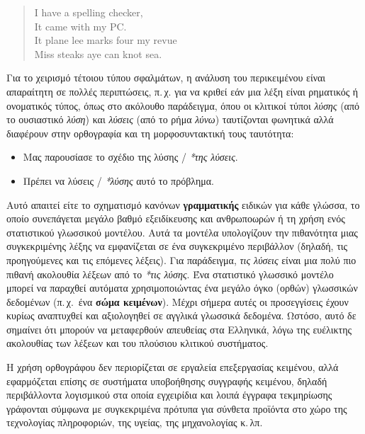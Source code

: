 \documentclass[]{../../metanetpaper}
\begin{document}
\begin{multicols}{2}
\begin{quote}
  I have a spelling checker,\\
  It came with my PC.\\
  It plane lee marks four my revue\\
  Miss steaks aye can knot sea.
\end{quote}

Για το χειρισμό τέτοιου τύπου σφαλμάτων, η ανάλυση του περικειμένου είναι απαραίτητη σε πολλές περιπτώσεις, π.\,χ. για να κριθεί εάν μια λέξη είναι ρηματικός ή ονοματικός τύπος, όπως στο ακόλουθο παράδειγμα, όπου οι κλιτικοί τύποι  \textit{λύσης} (από το ουσιαστικό  \textit{λύση}) και  \textit{λύσεις} (από το ρήμα  \textit{λύνω}) ταυτίζονται φωνητικά αλλά διαφέρουν στην ορθογραφία και τη μορφοσυντακτική τους ταυτότητα:

\begin{itemize}
\item Μας παρουσίασε το σχέδιο της λύσης / \textit{*της λύσεις}.
\item Πρέπει να λύσεις / \textit{*λύσης} αυτό το πρόβλημα.
\end{itemize}

Αυτό απαιτεί είτε το σχηματισμό κανόνων \textbf{γραμματικής} ειδικών για κάθε γλώσσα, το οποίο συνεπάγεται μεγάλο βαθμό εξειδίκευσης και ανθρωποωρών ή τη χρήση ενός στατιστικού γλωσσικού μοντέλου. Αυτά τα μοντέλα υπολογίζουν την πιθανότητα μιας συγκεκριμένης λέξης να εμφανίζεται σε ένα συγκεκριμένο περιβάλλον (δηλαδή, τις προηγούμενες και τις επόμενες λέξεις). Για παράδειγμα, \textit{τις λύσεις} είναι μια πολύ πιο πιθανή ακολουθία λέξεων από το \textit{*τις λύσης}.
Ένα στατιστικό γλωσσικό μοντέλο μπορεί να παραχθεί αυτόματα χρησιμοποιώντας ένα μεγάλο όγκο (ορθών) γλωσσικών δεδομένων (π.\,χ.~ένα \textbf{σώμα κειμένων}). Μέχρι σήμερα αυτές οι προσεγγίσεις έχουν κυρίως αναπτυχθεί και αξιολογηθεί σε αγγλικά γλωσσικά δεδομένα. Ωστόσο, αυτό δε σημαίνει ότι μπορούν να μεταφερθούν απευθείας στα Ελληνικά, λόγω της ευέλικτης ακολουθίας των λέξεων και του πλούσιου κλιτικού συστήματος.


Η χρήση ορθογράφου δεν περιορίζεται σε εργαλεία επεξεργασίας κειμένου, αλλά εφαρμόζεται επίσης σε συστήματα  υποβοήθησης συγγραφής κειμένου, δηλαδή περιβάλλοντα λογισμικού στα οποία εγχειρίδια και λοιπά έγγραφα τεκμηρίωσης γράφονται σύμφωνα με συγκεκριμένα πρότυπα για σύνθετα προϊόντα στο χώρο της τεχνολογίας πληροφοριών, της υγείας, της μηχανολογίας κ.\,λπ.


\end{multicols}
\end{document}
